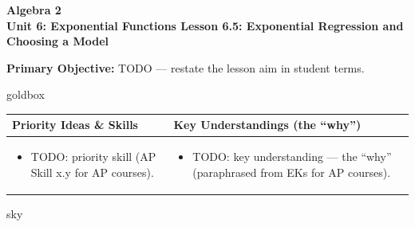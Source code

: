 \documentclass[10pt]{article}
\newcommand{\CourseName}{Algebra 2}
\newcommand{\UnitNumberName}{Unit 6: Exponential Functions \quad}
\newcommand{\LessonNumberName}{Lesson 6.5: Exponential Regression and Choosing a Model}
\begin{document}
\begin{center}
    {\Large\bfseries \CourseName \\
    {\small\bfseries \UnitNumberName \LessonNumberName}}
\end{center}

\begin{tcolorbox}[colback=forestbg, colframe=forest, boxrule=0.9pt, arc=2mm,
    left=2mm, right=2mm, top=1.5mm, bottom=1.5mm]
    \textbf{Primary Objective:} TODO --- restate the lesson aim in student terms.
\end{tcolorbox}

\renewcommand{\arraystretch}{1.4}
\begin{skillbox}{goldbox}
\begin{tabularx}{\linewidth}{@{}X|X@{}}
\textbf{Priority Ideas \& Skills} & \textbf{Key Understandings (the ``why'')} \\[2pt]
\hline
\vspace{-6pt}
\begin{itemize}[leftmargin=1.1em, nosep, after=\vspace{2pt}]
  \item TODO: priority skill (AP Skill x.y for AP courses).
\end{itemize}
&
\vspace{-6pt}
\begin{itemize}[leftmargin=1.1em, nosep, after=\vspace{2pt}]
  \item TODO: key understanding --- the ``why'' (paraphrased from EKs for AP courses).
\end{itemize}
\end{tabularx}
\end{skillbox}

\begin{skillbox}{sky}
\end{skillbox}
\end{document}
